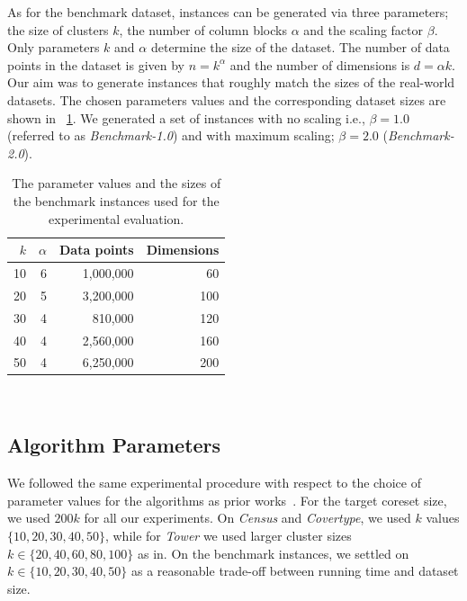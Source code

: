 As for the benchmark dataset, instances can be generated via three parameters; the size of clusters $k$, the number of column blocks $\alpha$ and the scaling factor $\beta$. Only parameters $k$ and $\alpha$ determine the size of the dataset. The number of data points in the dataset is given by $n=k^{\alpha}$ and the number of dimensions is $d=\alpha k$. Our aim was to generate instances that roughly match the sizes of the real-world datasets. The chosen parameters values and the corresponding dataset sizes are shown in ~\cref{tab:benchmark-instances-overview}. We generated a set of instances with no scaling i.e., $\beta=1.0$ (referred to as \textit{Benchmark-1.0}) and with maximum scaling; $\beta = 2.0$ (\textit{Benchmark-2.0}).



%
\begin{table}
	\begin{center}%
	\caption{The parameter values and the sizes of the benchmark instances used for the experimental evaluation.}
	\label{tab:benchmark-instances-overview}
	\begin{tabular}{rrrr}
		\toprule
        $k$
		    & $\alpha$
		    & Data points
		    & Dimensions
            \\
		\midrule
        10
    		& 6
    		& 1,000,000
    		& 60
    		\\
        20
    		& 5
    		& 3,200,000
    		& 100
    		\\
        30
    		& 4
    		& 810,000
    		& 120
    		\\
        40
    		& 4
    		& 2,560,000
    		& 160
    		\\
        50
    		& 4
    		& 6,250,000
    		& 200
    		\\
		\bottomrule
	\end{tabular}\\
	\end{center}
\end{table}

\subsection{Algorithm Parameters}
We followed the same experimental procedure with respect to the choice of parameter values for the algorithms as prior works~\cite{FGSSS13, AckermannMRSLS12}. For the target coreset size, we used $200k$ for all our experiments. On \textit{Census} and \textit{Covertype}, we used $k$ values $\{10, 20, 30, 40, 50\}$, while for \textit{Tower} we used larger cluster sizes $k \in \{20, 40, 60, 80, 100\}$ as in. On the benchmark instances, we settled on $k \in \{10, 20, 30, 40, 50\}$ as a reasonable trade-off between running time and dataset size.



